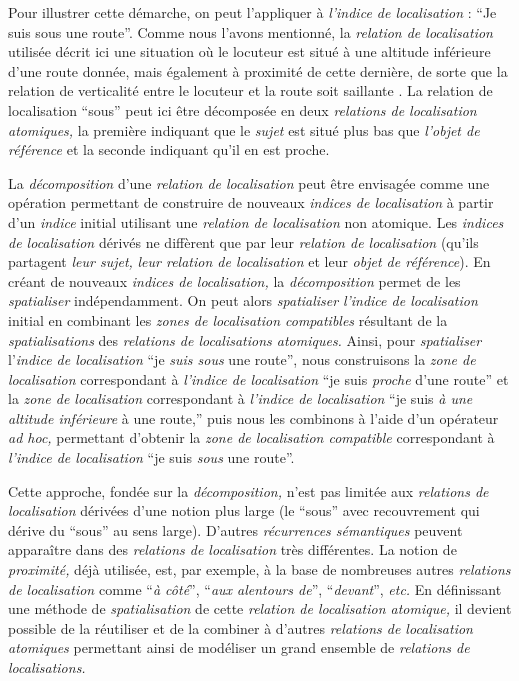 Pour illustrer cette démarche, on peut l'appliquer à \emph{l'indice de
  localisation} : \enquote{Je suis sous une route}. Comme nous l'avons
mentionné, la \emph{relation de localisation} utilisée décrit ici une
situation où le locuteur est situé à une altitude inférieure d'une
route donnée, mais également à proximité de cette dernière, de sorte
que la relation de verticalité entre le locuteur et la route soit
saillante \autocite{Vandeloise1986}. La relation de localisation
\enquote{sous} peut ici être décomposée en deux \emph{relations de
  localisation atomiques,} la première indiquant que le \emph{sujet}
est situé plus bas que \emph{l'objet de référence} et la seconde
indiquant qu'il en est proche.

La \emph{décomposition} d'une \emph{relation de localisation} peut
être envisagée comme une opération permettant de construire de
nouveaux \emph{indices de localisation} à partir d'un \emph{indice}
initial utilisant une \emph{relation de localisation} non
atomique. Les \emph{indices de localisation} dérivés ne diffèrent que
par leur \emph{relation de localisation} (\ie qu'ils partagent
\emph{leur sujet,} \emph{leur relation de localisation} et leur
\emph{objet de référence}). En créant de nouveaux \emph{indices de
  localisation,} la \emph{décomposition} permet de les
\emph{spatialiser} indépendamment. On peut alors \emph{spatialiser}
\emph{l'indice de localisation} initial en combinant les \emph{zones
  de localisation compatibles} résultant de la \emph{spatialisations}
des \emph{relations de localisations atomiques.} Ainsi, pour
\emph{spatialiser} l'\emph{indice de localisation} \enquote{je
  \emph{suis sous} une route}, nous construisons la \emph{zone de
  localisation} correspondant à \emph{l'indice de localisation}
\enquote{je suis \emph{proche} d'une route} et la \emph{zone de
  localisation} correspondant à \emph{l'indice de localisation}
\enquote{je suis \emph{à une altitude inférieure} à une route,} puis
nous les combinons à l'aide d'un opérateur \emph{ad hoc,} permettant
d'obtenir la \emph{zone de localisation compatible} correspondant à
\emph{l'indice de localisation} \enquote{je suis \emph{sous} une
  route}.

Cette approche, fondée sur la \emph{décomposition,} n'est pas limitée
aux \emph{relations de localisation} dérivées d'une notion plus large
(\eg le \enquote{sous} avec recouvrement qui dérive du \enquote{sous}
au sens large). D'autres \emph{récurrences sémantiques} peuvent
apparaître dans des \emph{relations de localisation} très
différentes. La notion de \emph{proximité,} déjà utilisée, est, par
exemple, à la base de nombreuses autres \emph{relations de
  localisation} comme \enquote{\emph{à côté}}, \enquote{\emph{aux
    alentours de}}, \enquote{\emph{devant}}, \emph{etc.} En
définissant une méthode de \emph{spatialisation} de cette
\emph{relation de localisation atomique,} il devient possible de la
réutiliser et de la combiner à d'autres \emph{relations de
  localisation atomiques} permettant ainsi de modéliser un grand
ensemble de \emph{relations de localisations.}

